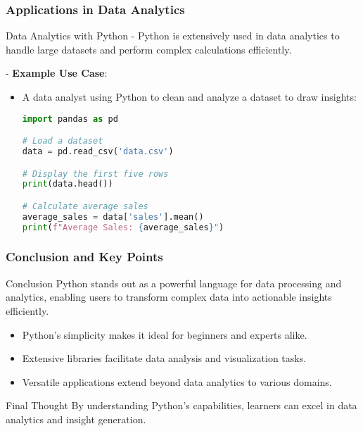 \documentclass[aspectratio=169]{beamer}
\begin{document}
\begin{frame}[fragile]
    \frametitle{Applications in Data Analytics}

    \begin{block}{Data Analytics with Python}
        - Python is extensively used in data analytics to handle large datasets and perform complex calculations efficiently.
        
        - \textbf{Example Use Case}:
        \begin{itemize}
            \item A data analyst using Python to clean and analyze a dataset to draw insights:
                \begin{lstlisting}[language=Python]
import pandas as pd

# Load a dataset
data = pd.read_csv('data.csv')

# Display the first five rows
print(data.head())

# Calculate average sales
average_sales = data['sales'].mean()
print(f"Average Sales: {average_sales}")
                \end{lstlisting}
        \end{itemize}
    \end{block}   
\end{frame}

\begin{frame}[fragile]
    \frametitle{Conclusion and Key Points}

    \begin{block}{Conclusion}
        Python stands out as a powerful language for data processing and analytics, 
        enabling users to transform complex data into actionable insights efficiently.
    \end{block}

    \begin{itemize}
        \item Python's simplicity makes it ideal for beginners and experts alike.
        \item Extensive libraries facilitate data analysis and visualization tasks.
        \item Versatile applications extend beyond data analytics to various domains.
    \end{itemize}

    \begin{block}{Final Thought}
        By understanding Python's capabilities, learners can excel in data analytics and insight generation.
    \end{block}
\end{frame}
\end{document}
